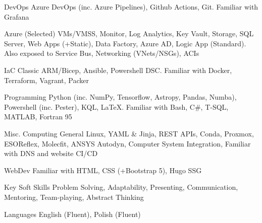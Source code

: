 

\begin{cvskills}

  \cvskill
    {DevOps} 
    {Azure DevOps (inc. Azure Pipelines), Github Actions, Git. Familiar with Grafana} 

  \cvskill
    {Azure (Selected)} 
    {VMs/VMSS, Monitor, Log Analytics, Key Vault, Storage, SQL Server, Web Apps (+Static), Data Factory, Azure AD, Logic App (Standard). Also exposed to Service Bus, Networking (VNets/NSGs), ACIs}

  \cvskill
    {IaC} 
    {Classic ARM/Bicep, Ansible, Powershell DSC. Familiar with Docker, Terraform, Vagrant, Packer} 

  \cvskill
    {Programming} 
    {Python (inc. NumPy, Tensorflow, Astropy, Pandas, Numba), Powershell (inc. Pester), KQL, \LaTeX. Familiar with Bash, C\#, T-SQL, MATLAB, Fortran 95} 
    
  \cvskill
    {Misc. Computing} 
    {General Linux, YAML \& Jinja, REST APIs, Conda, Proxmox, ESOReflex, Molecfit, ANSYS Autodyn, Computer System Integration, Familiar with DNS and website CI/CD} 

  \cvskill
    {WebDev} 
    {Familiar with HTML, CSS (+Bootstrap 5), Hugo SSG} 

  \cvskill
    {Key Soft Skills} 
    {Problem Solving, Adaptability, Presenting, Communication, Mentoring, Team-playing, Abstract Thinking} 

  \cvskill
    {Languages} 
    {English (Fluent), Polish (Fluent)} 
    
\end{cvskills}
